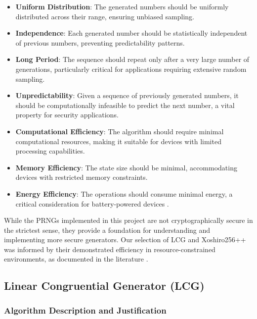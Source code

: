 \begin{itemize}
    \item \textbf{Uniform Distribution}: The generated numbers should be uniformly distributed across their range, ensuring unbiased sampling.
    
    \item \textbf{Independence}: Each generated number should be statistically independent of previous numbers, preventing predictability patterns.
    
    \item \textbf{Long Period}: The sequence should repeat only after a very large number of generations, particularly critical for applications requiring extensive random sampling.
    
    \item \textbf{Unpredictability}: Given a sequence of previously generated numbers, it should be computationally infeasible to predict the next number, a vital property for security applications.
    
    \item \textbf{Computational Efficiency}: The algorithm should require minimal computational resources, making it suitable for devices with limited processing capabilities.
    
    \item \textbf{Memory Efficiency}: The state size should be minimal, accommodating devices with restricted memory constraints.
    
    \item \textbf{Energy Efficiency}: The operations should consume minimal energy, a critical consideration for battery-powered devices \cite{embedded_prng}.
\end{itemize}

While the PRNGs implemented in this project are not cryptographically secure in the strictest sense, they provide a foundation for understanding and implementing more secure generators. Our selection of LCG and Xoshiro256++ was informed by their demonstrated efficiency in resource-constrained environments, as documented in the literature \cite{prng_iot, xoshiro_website}.

\subsection{Linear Congruential Generator (LCG)}

\subsubsection{Algorithm Description and Justification}

